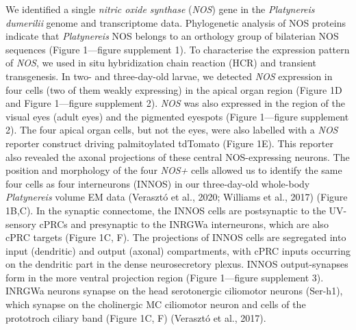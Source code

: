 \documentclass[
  10pt,
  onecolumn]{article}
\begin{document}
We identified a single \emph{nitric oxide synthase} (\emph{NOS}) gene in
the \emph{Platynereis dumerilii} genome and transcriptome data.
Phylogenetic analysis of NOS proteins indicate that \emph{Platynereis}
NOS belongs to an orthology group of bilaterian NOS sequences (Figure
1---figure supplement 1). To characterise the expression pattern of
\emph{NOS}, we used in situ hybridization chain reaction (HCR) and
transient transgenesis. In two- and three-day-old larvae, we detected
\emph{NOS} expression in four cells (two of them weakly expressing) in
the apical organ region (Figure 1D and Figure 1---figure supplement 2).
\emph{NOS} was also expressed in the region of the visual eyes (adult
eyes) and the pigmented eyespots (Figure 1---figure supplement 2). The
four apical organ cells, but not the eyes, were also labelled with a
\emph{NOS} reporter construct driving palmitoylated tdTomato (Figure
1E). This reporter also revealed the axonal projections of these central
NOS-expressing neurons. The position and morphology of the four
\emph{NOS+} cells allowed us to identify the same four cells as four
interneurons (INNOS) in our three-day-old whole-body \emph{Platynereis}
volume EM data (Verasztó et al., 2020; Williams et al., 2017) (Figure
1B,C). In the synaptic connectome, the INNOS cells are postsynaptic to
the UV-sensory cPRCs and presynaptic to the INRGWa interneurons, which
are also cPRC targets (Figure 1C, F). The projections of INNOS cells are
segregated into input (dendritic) and output (axonal) compartments, with
cPRC inputs occurring on the dendritic part in the dense neurosecretory
plexus. INNOS output-synapses form in the more ventral projection region
(Figure 1---figure supplement 3). INRGWa neurons synapse on the head
serotonergic ciliomotor neurons (Ser-h1), which synapse on the
cholinergic MC ciliomotor neuron and cells of the prototroch ciliary
band (Figure 1C, F) (Verasztó et al., 2017).
\end{document}
